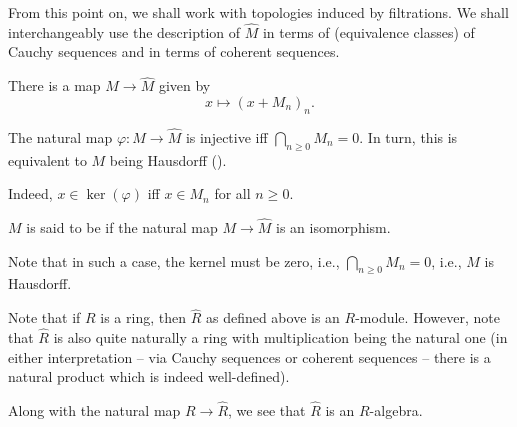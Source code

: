 \begin{rem}
	From this point on, we shall work with topologies induced by filtrations. We shall interchangeably use the description of $\widehat{M}$ in terms of (equivalence classes) of Cauchy sequences and in terms of coherent sequences.

	There is a map $M \to \widehat{M}$ given by
	\begin{equation*} 
		x \mapsto (x + M_{n})_{n}.
	\end{equation*}
\end{rem}

\begin{obs}
	The natural map $\varphi : M \to \widehat{M}$ is injective iff $\bigcap_{n \ge 0} M_{n} = 0$. In turn, this is equivalent to $M$ being Hausdorff (). 

	Indeed, $x \in \ker(\varphi)$ iff $x \in M_{n}$ for all $n \ge 0$.
\end{obs}

\begin{defn}
	$M$ is said to be  if the natural map $M \to \widehat{M}$ is an isomorphism.
\end{defn}
Note that in such a case, the kernel must be zero, i.e., $\bigcap_{n \ge 0} M_{n} = 0$, i.e., $M$ is Hausdorff.

\begin{rem}
	Note that if $R$ is a ring, then $\widehat{R}$ as defined above is an $R$-module. However, note that $\widehat{R}$ is also quite naturally a ring with multiplication being the natural one (in either interpretation -- via Cauchy sequences or coherent sequences -- there is a natural product which is indeed well-defined). 

	Along with the natural map $R \to \widehat{R}$, we see that $\widehat{R}$ is an $R$-algebra.
\end{rem}

